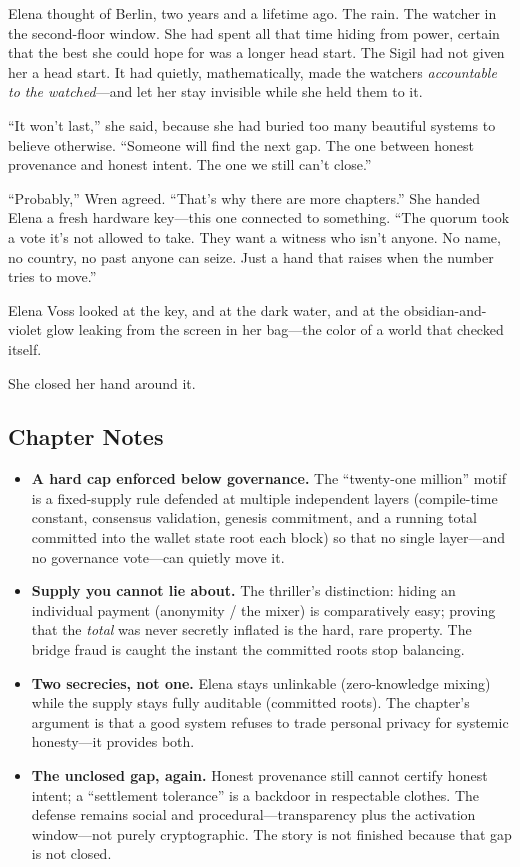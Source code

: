 Elena thought of Berlin, two years and a lifetime ago. The rain. The watcher in
the second-floor window. She had spent all that time hiding from power, certain
that the best she could hope for was a longer head start. The Sigil had not given
her a head start. It had quietly, mathematically, made the watchers
\emph{accountable to the watched}---and let her stay invisible while she held them
to it.

``It won't last,'' she said, because she had buried too many beautiful systems to
believe otherwise. ``Someone will find the next gap. The one between honest
provenance and honest intent. The one we still can't close.''

``Probably,'' Wren agreed. ``That's why there are more chapters.'' She handed
Elena a fresh hardware key---this one connected to something. ``The quorum took a
vote it's not allowed to take. They want a witness who isn't anyone. No name, no
country, no past anyone can seize. Just a hand that raises when the number tries
to move.''

Elena Voss looked at the key, and at the dark water, and at the obsidian-and-violet
glow leaking from the screen in her bag---the color of a world that checked
itself.

She closed her hand around it.

\hypertarget{chapter-8-notes}{%
\subsection{Chapter Notes}\label{chapter-8-notes}}

\begin{itemize}
\tightlist
\item
  \textbf{A hard cap enforced below governance.} The ``twenty-one million''
  motif is a fixed-supply rule defended at multiple independent layers
  (compile-time constant, consensus validation, genesis commitment, and a
  running total committed into the wallet state root each block) so that no
  single layer---and no governance vote---can quietly move it.
\item
  \textbf{Supply you cannot lie about.} The thriller's distinction: hiding an
  individual payment (anonymity / the mixer) is comparatively easy; proving that
  the \emph{total} was never secretly inflated is the hard, rare property. The
  bridge fraud is caught the instant the committed roots stop balancing.
\item
  \textbf{Two secrecies, not one.} Elena stays unlinkable (zero-knowledge
  mixing) while the supply stays fully auditable (committed roots). The chapter's
  argument is that a good system refuses to trade personal privacy for systemic
  honesty---it provides both.
\item
  \textbf{The unclosed gap, again.} Honest provenance still cannot certify
  honest intent; a ``settlement tolerance'' is a backdoor in respectable
  clothes. The defense remains social and procedural---transparency plus the
  activation window---not purely cryptographic. The story is not finished
  because that gap is not closed.
\end{itemize}
